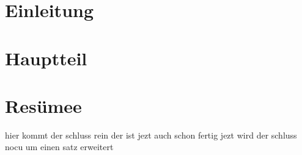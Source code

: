 \documentclass[11pt,a4paper]{article}
\begin{document}
\section{Einleitung}

\section{Hauptteil}

\section{Resümee}

hier kommt der schluss rein der ist jezt auch schon fertig
jezt wird der schluss nocu um einen satz erweitert
\end{document}
